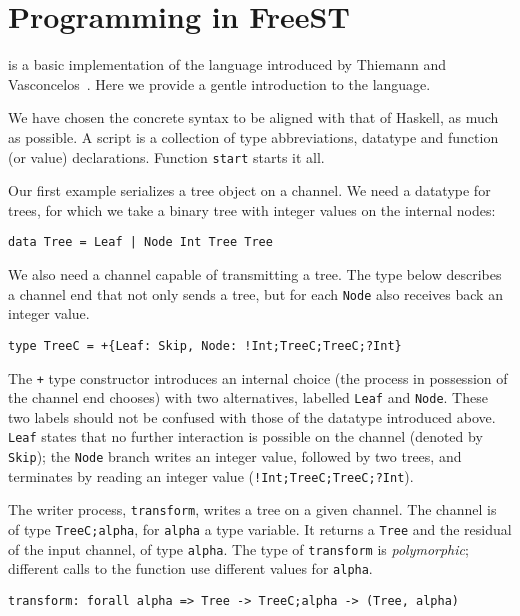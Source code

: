 \section{Programming in FreeST}
\label{sec:programming}

\freest{} is a basic implementation of the language introduced by
Thiemann and Vasconcelos~\cite{DBLP:conf/icfp/ThiemannV16}. Here we
provide a gentle introduction to the language.

We have chosen the concrete syntax to be aligned with that of Haskell,
as much as possible. A \freest{} script is a collection of type
abbreviations, datatype and function (or value) declarations. Function
\lstinline|start| starts it all.

Our first example serializes a tree object on a channel. We need a
datatype for trees, for which we take a binary tree with integer
values on the internal nodes:
%
\begin{lstlisting}
data Tree = Leaf | Node Int Tree Tree
\end{lstlisting}

We also need a channel capable of transmitting a tree. The type below
describes a channel end that not only sends a tree, but for each
\lstinline|Node| also receives back an integer value.
%
\begin{lstlisting}
type TreeC = +{Leaf: Skip, Node: !Int;TreeC;TreeC;?Int}
\end{lstlisting}

The \lstinline|+| type constructor introduces an internal choice (the
process in possession of the channel end chooses) with two
alternatives, labelled \lstinline|Leaf| and \lstinline|Node|. These
two labels should not be confused with those of the datatype
introduced above. \lstinline|Leaf| states that no further interaction
is possible on the channel (denoted by \lstinline|Skip|); the
\lstinline|Node| branch writes an integer value, followed by two
trees, and terminates by reading an integer value
(\lstinline|!Int;TreeC;TreeC;?Int|).

The writer process, \lstinline|transform|, writes a tree on a given
channel. The channel is of type \lstinline|TreeC;alpha|, for
\lstinline|alpha| a type variable. It returns a \lstinline|Tree| and
the residual of the input channel, of type \lstinline|alpha|. The type
of \lstinline|transform| is \emph{polymorphic}; different calls to the
function use different values for \lstinline|alpha|.

\begin{lstlisting}
transform: forall alpha => Tree -> TreeC;alpha -> (Tree, alpha)
\end{lstlisting}

